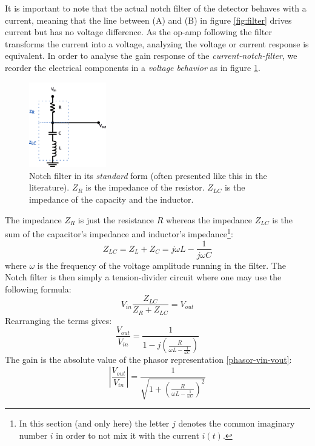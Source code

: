 \documentclass[11pt]{report}
\begin{document}
It is important to note that the actual notch filter of the detector behaves with a current, meaning that the line between (A) and (B) in figure \ref{fig:filter} drives current but has no voltage difference. As the op-amp following the filter transforms the current into a voltage, analyzing the voltage or current response is equivalent. In order to analyse the gain response of the \textit{current-notch-filter}, we reorder the electrical components in a \textit{voltage behavior} as in figure \ref{fig:notch-tension}.
\begin{figure}[h!]
\centering
\includegraphics[width=0.3\textwidth]{notch-tension}
\caption{Notch filter in its \textit{standard} form (often presented like this in the literature). $Z_R$ is the impedance of the resistor. $Z_{LC}$ is the impedance of the capacity and the inductor.}
\label{fig:notch-tension}
\end{figure}
The impedance $Z_R$ is just the resistance $R$ whereas the impedance $Z_{LC}$ is the sum of the capacitor's impedance and inductor's impedance\footnote{In this section (and only here) the letter $j$ denotes the common imaginary number $i$ in order to not mix it with the current $i(t)$.}:
\begin{equation}
Z_{LC} = Z_{L} + Z_{C} = j\omega L - \frac{1}{j\omega C}
\end{equation}
where $\omega$ is the frequency of the voltage amplitude running in the filter. The Notch filter is then simply a tension-divider circuit where one may use the following formula:
\begin{equation}
V_{in}\frac{Z_{LC}}{Z_{R} + Z_{LC}} = V_{out}
\end{equation}
Rearranging the terms gives:
\begin{equation}
\frac{V_{out}}{V_{in}} = \frac{1}{1 - j\left( \frac{R}{\omega L - \frac{1}{\omega C}} \right)}
\label{phasor-vin-vout}
\end{equation}
The gain is the absolute value of the phasor representation \ref{phasor-vin-vout}:
\begin{equation}
\left\vert \frac{V_{out}}{V_{in}} \right\vert = \frac{1}{\sqrt{1 + \left( \frac{R}{\omega L - \frac{1}{\omega C}} \right)^2}}
\end{equation}
\end{document}
